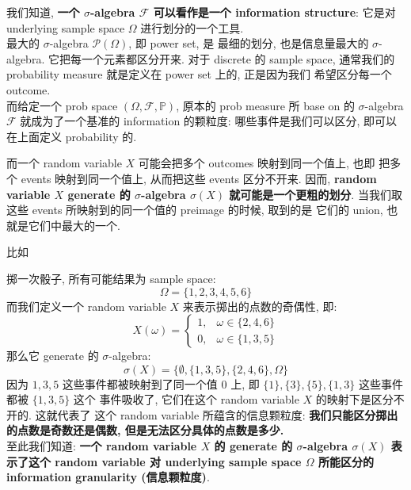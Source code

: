 \begin{remark}
我们知道, \textbf{一个 $\sigma$-algebra \(\mathcal{F}\) 可以看作是一个 information structure}: 
它是对 underlying sample space \(\Omega\) 进行划分的一个工具. \\

最大的 \(\sigma\)-algebra \(\mathcal{P}(\Omega)\), 即 power set, 是
最细的划分, 也是信息量最大的 \(\sigma\)-algebra. 它把每一个元素都区分开来. 对于 discrete 的
sample space, 通常我们的 probability measure 就是定义在 power set 上的, 正是因为我们
希望区分每一个 outcome.\\

而给定一个 prob space \((\Omega, \mathcal{F}, \mathbb{P})\), 原本的 prob measure 所 base on 的
 \(\sigma\)-algebra \(\mathcal{F}\) 就成为了一个基准的 information 的颗粒度: 
 哪些事件是我们可以区分, 即可以在上面定义 probability 的.

而一个 random variable $X$ 可能会把多个 outcomes 映射到同一个值上, 也即
把多个 events 映射到同一个值上, 从而把这些 events 区分不开来. 
因而, \textbf{random variable \(X\) generate 的 \(\sigma\)-algebra \(\sigma(X)\) 就可能是一个更粗的划分}.
当我们取这些 events 所映射到的同一个值的 preimage 的时候, 取到的是
它们的 union, 也就是它们中最大的一个.

比如
\begin{example}
掷一次骰子, 所有可能结果为 sample space: $$\Omega = \{1, 2, 3, 4, 5, 6\}$$
而我们定义一个 random variable \(X\) 来表示掷出的点数的奇偶性, 即:
$$X(\omega) = \begin{cases} 
1, & \omega \in \{2, 4, 6\} \\ 
0, & \omega \in \{1, 3, 5\} 
\end{cases}$$
那么它 generate 的 $\sigma$-algebra:
$$\sigma(X) = \big\{ \emptyset, \{1, 3, 5\}, \{2, 4, 6\}, \Omega \big\}$$
因为 $1,3,5$ 这些事件都被映射到了同一个值 \(0\) 上, 即
 $\{1\}, \{3\}, \{5\}, \{1,3\}$ 这些事件都被 $\{1,3,5\}$ 这个
 事件吸收了, 它们在这个 random variable \(X\) 的映射下是区分不开的. 这就代表了
 这个 random variable 所蕴含的信息颗粒度: 
\textbf{我们只能区分掷出的点数是奇数还是偶数, 但是无法区分具体的点数是多少.}\\

至此我们知道: \textbf{一个 random variable \(X\) 的 generate 的 $\sigma$-algebra 
\(\sigma(X)\) 表示了这个 random variable 对 underlying sample space 
\(\Omega\) 所能区分的 information granularity (信息颗粒度)}.\\
\end{example}
\end{remark}


